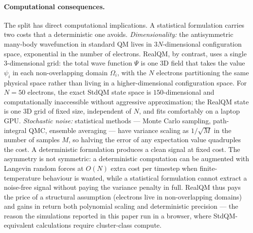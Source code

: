 \documentclass[11pt]{article}
\begin{document}
\paragraph{Computational consequences.}
The split has direct computational implications. A statistical formulation carries two costs that a deterministic one avoids. \emph{Dimensionality:} the antisymmetric many-body wavefunction in standard QM lives in $3N$-dimensional configuration space, exponential in the number of electrons. RealQM, by contrast, uses a single $3$-dimensional grid: the total wave function $\Psi$ is one $3$D field that takes the value $\psi_i$ in each non-overlapping domain $\Omega_i$, with the $N$ electrons partitioning the same physical space rather than living in a higher-dimensional configuration space. For $N=50$ electrons, the exact StdQM state space is $150$-dimensional and computationally inaccessible without aggressive approximation; the RealQM state is one $3$D grid of fixed size, independent of $N$, and fits comfortably on a laptop GPU. \emph{Stochastic noise:} statistical methods --- Monte Carlo sampling, path-integral QMC, ensemble averaging --- have variance scaling as $1/\sqrt{M}$ in the number of samples $M$, so halving the error of any expectation value quadruples the cost. A deterministic formulation produces a clean signal at fixed cost. The asymmetry is not symmetric: a deterministic computation can be augmented with Langevin random forces at $O(N)$ extra cost per timestep when finite-temperature behaviour is wanted, while a statistical formulation cannot extract a noise-free signal without paying the variance penalty in full. RealQM thus pays the price of a structural assumption (electrons live in non-overlapping domains) and gains in return both polynomial scaling and deterministic precision --- the reason the simulations reported in this paper run in a browser, where StdQM-equivalent calculations require cluster-class compute.
\end{document}
